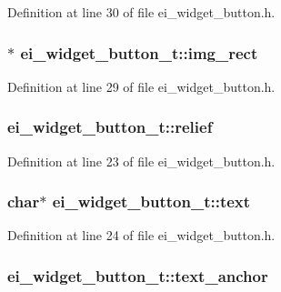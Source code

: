 Definition at line 30 of file ei\-\_\-widget\-\_\-button.\-h.

\hypertarget{structei__widget__button__t_aa41be279677fbc141d0e7a8041afd936}{
\subsubsection[{img\-\_\-rect}]{$\ast$ ei\-\_\-widget\-\_\-button\-\_\-t\-::img\-\_\-rect}}\label{structei__widget__button__t_aa41be279677fbc141d0e7a8041afd936}


Definition at line 29 of file ei\-\_\-widget\-\_\-button.\-h.

\hypertarget{structei__widget__button__t_a96c4fa4a563064cc4cb67066fbbddc2b}{
\subsubsection[{relief}]{ ei\-\_\-widget\-\_\-button\-\_\-t\-::relief}}\label{structei__widget__button__t_a96c4fa4a563064cc4cb67066fbbddc2b}


Definition at line 23 of file ei\-\_\-widget\-\_\-button.\-h.

\hypertarget{structei__widget__button__t_a3baa34b73437e99f2f0e162351a3ba84}{
\subsubsection[{text}]{\setlength{\rightskip}{0pt plus 5cm}char$\ast$ ei\-\_\-widget\-\_\-button\-\_\-t\-::text}}\label{structei__widget__button__t_a3baa34b73437e99f2f0e162351a3ba84}


Definition at line 24 of file ei\-\_\-widget\-\_\-button.\-h.

\hypertarget{structei__widget__button__t_a2897e23a54ab047beb6203d835191e8e}{
\subsubsection[{text\-\_\-anchor}]{ ei\-\_\-widget\-\_\-button\-\_\-t\-::text\-\_\-anchor}}\label{structei__widget__button__t_a2897e23a54ab047beb6203d835191e8e}


